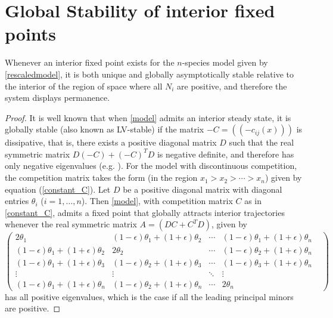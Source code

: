\section{Global Stability of interior fixed points}
\label{appendix1c}
\begin{lem}Whenever an interior fixed point exists for the $n$-species model given by \eqref{rescaledmodel}, it is both unique and globally asymptotically stable relative to the interior of the region of space where all $N_i$ are positive, and therefore the system displays permanence.\end{lem}
\begin{proof} It is well known that when \eqref{model} admits an interior steady state, it is globally stable (also known as LV-stable) if the  matrix $-C=((-c_{ij}(x)))$ is dissipative, that is, there exists a positive diagonal matrix $D$ such that the real symmetric matrix $D(-C)+(-C)^TD$ is negative definite, and therefore has only negative eigenvalues (e.g. \cite{hofandsig}). For the model with discontinuous competition,  the competition matrix takes the form (in the region $x_1>x_2>\cdots > x_n$) given by equation (\ref{constant_C}). 
Let $D$ be a positive diagonal matrix with diagonal entries $\theta_i$ ($i=1,\ldots,n$).
Then \eqref{model}, with competition matrix $C$ as in \eqref{constant_C}, admits a  fixed point that globally attracts interior trajectories whenever the real symmetric matrix $A=(DC+C^TD)$, given by
\[
\label{posdef}
\begin{pmatrix}
2\theta_1&(1-\epsilon)\theta_1+(1+\epsilon)\theta_2&\cdots&(1-\epsilon)\theta_1+(1+\epsilon)\theta_n\\
(1-\epsilon)\theta_1+(1+\epsilon)\theta_2&2\theta_2& \cdots&(1-\epsilon)\theta_2+(1+\epsilon)\theta_n\\
(1-\epsilon)\theta_1+(1+\epsilon)\theta_3&(1-\epsilon)\theta_2+(1+\epsilon)\theta_3&\cdots&(1-\epsilon)\theta_3+(1+\epsilon)\theta_n\\
\vdots&\vdots&\ddots&\vdots&\\
(1-\epsilon)\theta_1+(1+\epsilon)\theta_n&(1-\epsilon)\theta_2+(1+\epsilon)\theta_n&\cdots&2\theta_n
\end{pmatrix} 
\]
has all positive eigenvalues, which is the case if all the leading principal minors are positive.


\end{proof}
